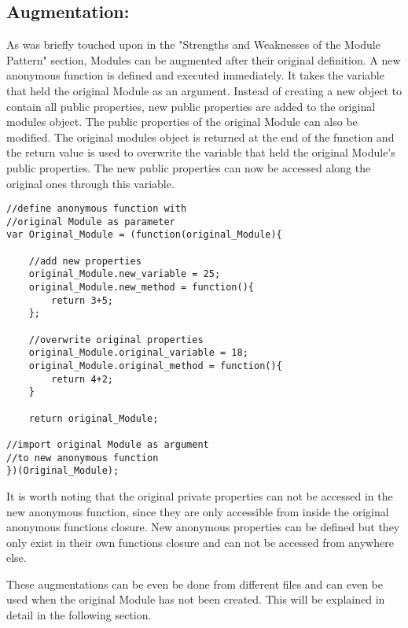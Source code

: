 \documentclass{bioinfo}
\begin{document}
\subsection{Augmentation:}
As was briefly touched upon in the "Strengths and Weaknesses of the Module Pattern" section, Modules can be augmented after their original definition. A new anonymous function is defined and executed immediately. It takes the variable that held the original Module as an argument. Instead of creating a new object to contain all public properties, new public properties are added to the original modules object. The public properties of the original Module can also be modified. The original modules object is returned at the end of the function and the return value is used to overwrite the variable that held the original Module's public properties. The new public properties can now be accessed along the original ones through this variable. \\


\begin{lstlisting}
//define anonymous function with
//original Module as parameter
var Original_Module = (function(original_Module){

	//add new properties
	original_Module.new_variable = 25;
	original_Module.new_method = function(){
		return 3+5;
	};

	//overwrite original properties
	original_Module.original_variable = 18;
	original_Module.original_method = function(){
		return 4+2;
	}

	return original_Module;

//import original Module as argument
//to new anonymous function
})(Original_Module);
\end{lstlisting}



It is worth noting that the original private properties can not be accessed in the new anonymous function, since they are only accessible from inside the original anonymous functions closure. New anonymous properties can be defined but they only exist in their own functions closure and can not be accessed from anywhere else.\vspace{\baselineskip}

These augmentations can be even be done from different files and can even be used when the original Module has not been created. This will be explained in detail in the following section.
\end{document}
